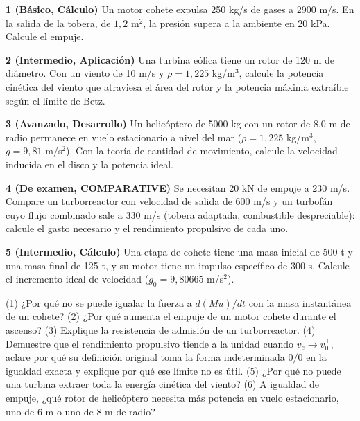 \documentclass[10pt,openany]{book}
\begin{document}
\begin{tcolorbox}[title={Ejercicios propuestos}, studiumworked, breakable]

\noindent\textbf{1 (Básico, Cálculo)}
Un motor cohete expulsa 250 kg/s de gases a 2900 m/s. En la salida de la tobera, de \(1{,}2\) m\(^2\), la presión supera a la ambiente en 20 kPa. Calcule el empuje.

\noindent\textbf{2 (Intermedio, Aplicación)}
Una turbina eólica tiene un rotor de 120 m de diámetro. Con un viento de 10 m/s y \(\rho = 1{,}225\) kg/m\(^3\), calcule la potencia cinética del viento que atraviesa el área del rotor y la potencia máxima extraíble según el límite de Betz.

\noindent\textbf{3 (Avanzado, Desarrollo)}
Un helicóptero de 5000 kg con un rotor de 8,0 m de radio permanece en vuelo estacionario a nivel del mar (\(\rho = 1{,}225\) kg/m\(^3\), \(g = 9{,}81\) m/s\(^2\)). Con la teoría de cantidad de movimiento, calcule la velocidad inducida en el disco y la potencia ideal.

\noindent\textbf{4 (De examen, COMPARATIVE)}
Se necesitan 20 kN de empuje a 230 m/s. Compare un turborreactor con velocidad de salida de 600 m/s y un turbofán cuyo flujo combinado sale a 330 m/s (tobera adaptada, combustible despreciable): calcule el gasto necesario y el rendimiento propulsivo de cada uno.

\noindent\textbf{5 (Intermedio, Cálculo)}
Una etapa de cohete tiene una masa inicial de 500 t y una masa final de 125 t, y su motor tiene un impulso específico de 300 s. Calcule el incremento ideal de velocidad (\(g_0 = 9{,}80665\) m/s\(^2\)).
\end{tcolorbox}

\begin{tcolorbox}[title={Autoevaluación}, studiumcheck, breakable]

(1) ¿Por qué no se puede igualar la fuerza a \(d(Mu)/dt\) con la masa instantánea de un cohete? (2) ¿Por qué aumenta el empuje de un motor cohete durante el ascenso? (3) Explique la resistencia de admisión de un turborreactor. (4) Demuestre que el rendimiento propulsivo tiende a la unidad cuando \(v_e \to v_0^+\), aclare por qué su definición original toma la forma indeterminada \(0/0\) en la igualdad exacta y explique por qué ese límite no es útil. (5) ¿Por qué no puede una turbina extraer toda la energía cinética del viento? (6) A igualdad de empuje, ¿qué rotor de helicóptero necesita más potencia en vuelo estacionario, uno de 6 m o uno de 8 m de radio?
\end{tcolorbox}
\studiumchaptercheck
\end{document}

